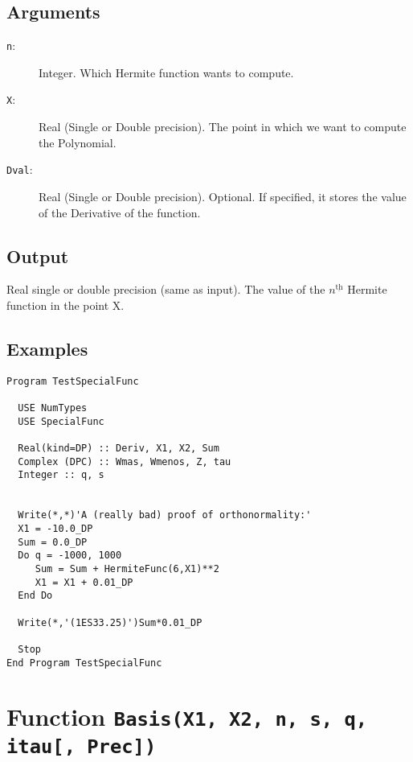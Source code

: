 \subsection{Arguments}

\begin{description}
\item[\texttt{n}:] Integer. Which Hermite function wants to compute.
\item[\texttt{X}:] Real (Single or Double precision). The point in
  which we want to compute the Polynomial.
\item[\texttt{Dval}:] Real (Single or Double precision). Optional. If
  specified, it stores the value of the Derivative of the
  function.
\end{description}

\subsection{Output}

Real single or double precision (same as input). The value of the
$n^{\underline{\text{th}}}$ Hermite function in the point X.

\subsection{Examples}

\begin{lstlisting}[emph=HermiteFunc,
                   emphstyle=\color{blue},
                   frame=trBL,
                   caption=Compute the Hermite functions.,
                   label=hermitefunc]
Program TestSpecialFunc

  USE NumTypes
  USE SpecialFunc

  Real(kind=DP) :: Deriv, X1, X2, Sum
  Complex (DPC) :: Wmas, Wmenos, Z, tau
  Integer :: q, s


  Write(*,*)'A (really bad) proof of orthonormality:'
  X1 = -10.0_DP
  Sum = 0.0_DP
  Do q = -1000, 1000
     Sum = Sum + HermiteFunc(6,X1)**2
     X1 = X1 + 0.01_DP
  End Do

  Write(*,'(1ES33.25)')Sum*0.01_DP

  Stop
End Program TestSpecialFunc
\end{lstlisting}

\section{Function \texttt{Basis(X1, X2, n, s, q, itau[, Prec]) }}

